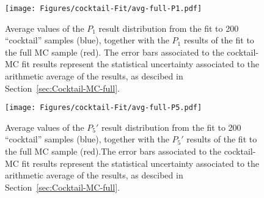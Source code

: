 \begin{figure}[!hbt]
  \centering
  \texttt{[image: Figures/cocktail-Fit/avg-full-P1.pdf]}
  \caption{Average values of the $P_1$ result distribution from the fit to 200 ``cocktail'' samples (blue), together with the $P_1$ results of the fit to the full MC sample (red). The error bars associated to the cocktail-MC fit results represent the statistical uncertainty associated to the arithmetic average of the results, as descibed in Section~\ref{sec:Cocktail-MC-full}.}
  \label{fig:closure-full-cocktail-p1}
\end{figure}

\begin{figure}[!hbt]
  \centering
  \texttt{[image: Figures/cocktail-Fit/avg-full-P5.pdf]}
  \caption{Average values of the $P_5'$ result distribution from the fit to 200 ``cocktail'' samples (blue), together with the $P_5'$ results of the fit to the full MC sample (red).The error bars associated to the cocktail-MC fit results represent the statistical uncertainty associated to the arithmetic average of the results, as descibed in Section~\ref{sec:Cocktail-MC-full}.}
  \label{fig:closure-full-cocktail-P5'}
\end{figure}







